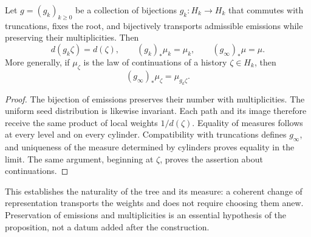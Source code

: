 \begin{proposition}
\label{act21:prop:ch-naturalidad-medida}
Let \(g=(g_k)_{k\geq0}\) be a collection of bijections \(g_k:H_k\to H_k\)
that commutes with truncations, fixes the root, and bijectively transports
admissible emissions while preserving their multiplicities. Then
\[
 d(g_k\zeta)=d(\zeta),\qquad
 (g_k)_*\mu_k=\mu_k,\qquad (g_\infty)_*\mu=\mu.
\]
More generally, if \(\mu_\zeta\) is the law of continuations of a
history \(\zeta\in H_k\), then
\[
 (g_\infty)_*\mu_\zeta=\mu_{g_k\zeta}.
\]
\end{proposition}

\begin{proof}
The bijection of emissions preserves their number with multiplicities. The
uniform seed distribution is likewise invariant. Each path
and its image therefore receive the same product of local weights
\(1/d(\zeta)\). Equality of measures follows at every level and on
every cylinder. Compatibility with truncations defines \(g_\infty\),
and uniqueness of the measure determined by cylinders proves equality
in the limit. The same argument, beginning at \(\zeta\), proves the
assertion about continuations.
\end{proof}

This establishes the naturality of the tree and its measure: a coherent change
of representation transports the weights and does not require choosing them anew.
Preservation of emissions and multiplicities is an essential hypothesis of
the proposition, not a datum added after the construction.
